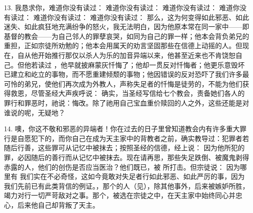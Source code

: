 13. 我恳求你，难道你没有读过： 难道你没有读过： 难道你没有读过： 难道你没有读过： 难道你没有读过： 难道你没有读过： 那么，这为何变得如此邪恶、如此迷失、如此疯狂地充满纷争的怒火，我无法明白，因为他原本常在同一家中——即基督的教会——为自己邻人的罪孽哀哭，如同为自己的罪一样；他本会背负弟兄的重担，正如宗徒所劝勉的；他本会用属天的劝言坚固那些在信德上动摇的人。但现在，自从他开始推行那仅以杀人为乐的加音异端以来，他甚至近来也不肯饶恕自己。但他若读过 ，他早就披麻蒙灰忏悔了；他却一贯反对忏悔者；他更乐意毁坏已建立和屹立的事物，而不愿重建倾颓的事物；他因错误的反对恐吓了我们许多最可怜的弟兄，使他们再次成为外教人，声称失足者的忏悔是徒劳的，不能为他们获得救恩，尽管圣经大声疾呼说： 确实，当圣经写信给七个教会，责备她们各人的罪行和罪恶时，祂说：悔改。除了祂用自己宝血重价赎回的人之外，这些还能是对谁说的呢，无疑地？\par

14. 噢，你这不敬和邪恶的异端者！你在过去的日子里曾知道教会内有许多重大罪行是自愿犯下的，而你自己在成为天主家中的背教者之前，确实教导过：犯罪者若随后行善，这些罪可从记忆中被抹去；按照圣经的信德，经上说： 因为他所犯的罪，必因随后的善行而从记忆中被抹去。现在请再思，那些失足跌倒、被魔鬼剥得赤露的人，他们的创伤是否应当医治？他们既已，被 所打击。但宗徒说：  因为哪里有 我们实在不必奇怪，这如今竟敢对失足者行如此邪恶、如此严厉的事，因为我们先前已有此类背信的例证。，那个的人（见），除其他事外，后来被嫉妒所胜，竭力对行一切严苛敌对之事。那个，被选在宗徒之中，在天主家中始终同心并忠心，后来他自己却背叛了天主。\par

